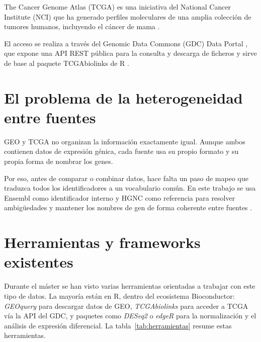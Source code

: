 \documentclass[12pt, a4paper]{report}
\begin{document}
The Cancer Genome Atlas (TCGA) es una iniciativa del National Cancer Institute (NCI) que ha generado perfiles moleculares de una amplia colección de tumores humanos, incluyendo el cáncer de mama \cite{national_cancer_institute_nci_using_nodate}.

El acceso se realiza a través del Genomic Data Commons (GDC) Data Portal \cite{noauthor_gdc_nodate}, que expone una API REST pública para la consulta y descarga de ficheros y sirve de base al paquete TCGAbiolinks de R \cite{colaprico_tcgabiolinks_2015}.

\section{El problema de la heterogeneidad entre fuentes}

GEO y TCGA no organizan la información exactamente igual. Aunque ambos contienen datos de expresión génica, cada fuente usa su propio formato y su propia forma de nombrar los genes.

Por eso, antes de comparar o combinar datos, hace falta un paso de mapeo que traduzca todos los identificadores a un vocabulario común. En este trabajo se usa Ensembl como identificador interno y HGNC como referencia para resolver ambigüedades y mantener los nombres de gen de forma coherente entre fuentes \cite{seal_genenamesorg_2022}.

\section{Herramientas y frameworks existentes}

Durante el máster se han visto varias herramientas orientadas a trabajar con este tipo de datos. La mayoría están en R, dentro del ecosistema Bioconductor: \textit{GEOquery} \cite{davis_geoquery_2007} para descargar datos de GEO, \textit{TCGAbiolinks} \cite{colaprico_tcgabiolinks_2015} para acceder a TCGA vía la API del GDC, y paquetes como \textit{DESeq2} \cite{love_moderated_2014} o \textit{edgeR} \cite{robinson_edger_2009} para la normalización y el análisis de expresión diferencial. La tabla~\ref{tab:herramientas} resume estas herramientas.
\end{document}
